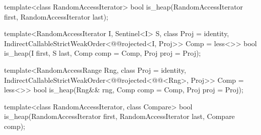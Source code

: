 %
\begin{removedblock}
\begin{itemdecl}
  template<class RandomAccessIterator>
    bool is_heap(RandomAccessIterator first, RandomAccessIterator last);
\end{itemdecl}
\end{removedblock}
\begin{addedblock}
\begin{itemdecl}
template<RandomAccessIterator I, Sentinel<I> S, class Proj = identity,
    IndirectCallableStrictWeakOrder<@@rojected<I, Proj>> Comp = less<>>
  bool is_heap(I first, S last, Comp comp = Comp{}, Proj proj = Proj{});

template<RandomAccessRange Rng, class Proj = identity,
    IndirectCallableStrictWeakOrder<@@rojected<@@<Rng>, Proj>> Comp = less<>>
  bool
    is_heap(Rng&& rng, Comp comp = Comp{}, Proj proj = Proj{});
\end{itemdecl}
\end{addedblock}

\begin{itemdescr}
\pnum
\returns {}
\end{itemdescr}

\begin{removedblock}
%
\begin{itemdecl}
  template<class RandomAccessIterator, class Compare>
    bool is_heap(RandomAccessIterator first, RandomAccessIterator last, Compare comp);
\end{itemdecl}

\begin{itemdescr}
\pnum
\returns {}
\end{itemdescr}
\end{removedblock}

